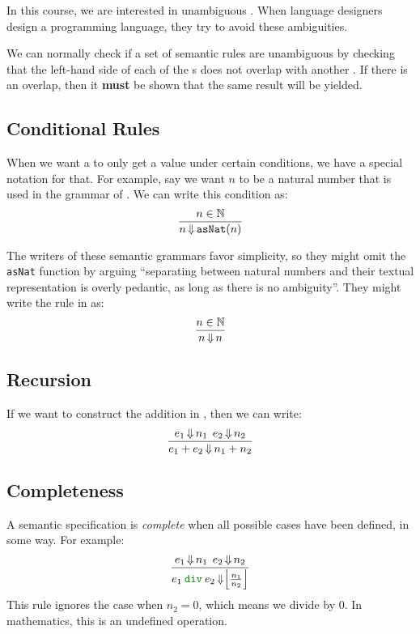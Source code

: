 In this course, we are interested in unambiguous .
When language designers design a programming language, they try to avoid these ambiguities.

We can normally check if a set of semantic rules are unambiguous by checking that the left-hand side of each of the s does not overlap with another .
If there is an overlap, then it \textbf{must} be shown that the same result will be yielded.

\subsection{Conditional Rules}\label{subsec:Conditional_Rules}
When we want a  to only get a value under certain conditions, we have a special notation for that.
For example, say we want $n$ to be a natural number that is used in the grammar of .
We can write this condition as:
\begin{equation}\label{eq:Conditional_Rules}
  \frac{n \in \operatorname{\mathbb{N}}}{n \operatorname{\Downarrow} \mathtt{asNat}(n)}
\end{equation}

The writers of these semantic grammars favor simplicity, so they might omit the \texttt{asNat} function by arguing ``separating between natural numbers and their textual representation is overly pedantic, as long as there is no ambiguity''.
They might write the rule in  as:
\begin{equation}\label{eq:Conditional_Rules_Simplified}
  \frac{n \in \operatorname{\mathbb{N}}}{n \operatorname{\Downarrow} n}
\end{equation}

\subsection{Recursion}\label{subsec:Semantics_Recursion}
If we want to construct the addition in , then we can write:
\begin{equation}\label{eq:Semantics_Recursion}
  \frac{e_{1} \operatorname{\Downarrow} n_{1} \:\: e_{2} \operatorname{\Downarrow} n_{2}}{e_{1}+e_{2} \operatorname{\Downarrow} n_{1}+n_{2}}
\end{equation}

\subsection{Completeness}\label{subsec:Semantic_Completeness}
A semantic specification is \emph{complete} when all possible cases have been defined, in some way.
For example:
\begin{equation}\label{eq:Incomplete_Semantic_Rule}
  \frac{e_{1} \EvaluatesTo n_{1} \:\: e_{2} \EvaluatesTo n_{2}}{e_{1} \:\SemanticInput{\mathtt{div}}\: e_{2} \EvaluatesTo \Bigl\lfloor \frac{n_{1}}{n_{2}} \Bigr\rfloor}
\end{equation}
This rule ignores the case when $n_{2} = 0$, which means we divide by 0.
In mathematics, this is an undefined operation.

